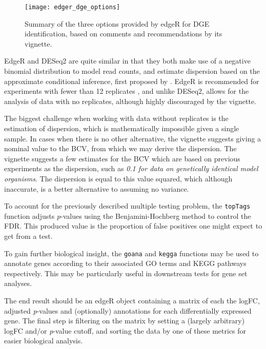 \begin{figure}[h!]
    \centering
    \texttt{[image: edger\_dge\_options]}
    \caption[Summary of the options provided by edgeR for DGE identification]{Summary of the three options provided by edgeR for \ac{DGE} identification, based on comments and recommendations by its vignette. } 
    \label{fig:edger_options}
\end{figure}

EdgeR and DESeq2 are quite similar in that they both make use of a negative binomial distribution to model read counts, and estimate dispersion based on the approximate conditional inference, first proposed by \cite{cox1987parameter}.  EdgeR is recommended for experiments with fewer than 12 replicates \citep{schurch2015evaluation}, and unlike DESeq2, allows for the analysis of data with no replicates, although highly discouraged by the vignette. 

The biggest challenge when working with data without replicates is the estimation of dispersion, which is mathematically impossible given a single sample. In cases when there is no other alternative, the vignette suggests giving a nominal value to the \ac{BCV}, from which we may derive the dispersion. The vignette suggests a few estimates for the \ac{BCV} which are based on previous experiments as the dispersion, such as \textit{0.1 for data on genetically identical model organisms}. The dispersion is equal to this value squared, which although inaccurate, is a better alternative to assuming no variance.

To account for the previously described multiple testing problem, the \texttt{topTags} function adjusts \textit{p}-values using the Benjamini-Hochberg method \citep{benjamini1995controlling} to control the \ac{FDR}. This produced value is the proportion of false positives one might expect to get from a test. %

To gain further biological insight, the \texttt{goana} and \texttt{kegga} functions may be used to annotate genes according to their associated \ac{GO} terms and \ac{KEGG} pathways respectively. This may be particularly useful in downstream tests for gene set analyses.

The end result should be an edgeR object containing a matrix of each the \ac{logFC}, adjusted \textit{p}-values and (optionally) annotations for each differentially expressed gene. The final step is filtering on the matrix by setting a (largely arbitrary) \ac{logFC} and/or \textit{p}-value cutoff, and sorting the data by one of these metrics for easier biological analysis.

